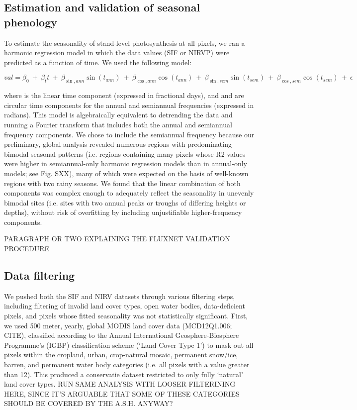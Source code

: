 \documentclass[9pt,twocolumn,twoside,lineno]{pnas-new}
\begin{document}
{\subsection*{Estimation and validation of seasonal phenology}
To estimate the seasonality of stand-level photosynthesis at all pixels,
we ran a harmonic regression model in which the data values (SIF or
NIRVP) were predicted as a function of time. We used the following model:

$$val=\beta _0\ +\ \beta _tt\ +\ \beta _{\sin ,ann}\sin (t_{ann})\ +\ \beta _{\cos ,ann}\cos (t_{ann})\ +\ \beta _{\sin ,sem}\sin (t_{sem})\ +\ \beta _{\cos ,sem}\cos (t_{sem})\ +\ \epsilon$$

where  is the linear time component (expressed in fractional days), and 
and  are circular time components for the annual and semiannual
frequencies (expressed in radians). This model is algebraically
equivalent to detrending the data and running a Fourier transform that
includes both the annual and semiannual frequency components. We chose to
include the semiannual frequency because our preliminary, global analysis
revealed numerous regions with predominating bimodal seasonal patterns
(i.e. regions containing many pixels whose R2 values were higher in
semiannual-only harmonic regression models than in annual-only models;
see Fig. SXX), many of which were expected on the basis of well-known
regions with two rainy seasons. We found that the linear combination of
both components was complex enough to adequately reflect the seasonality
in unevenly bimodal sites (i.e. sites with two annual peaks or troughs of
differing heights or depths), without risk of overfitting by including
unjustifiable higher-frequency components.

PARAGRAPH OR TWO EXPLAINING THE FLUXNET VALIDATION PROCEDURE

\subsection*{Data filtering}
We pushed both the SIF and NIRV datasets through various filtering steps,
including filtering of invalid land cover types, open water bodies,
data-deficient pixels, and pixels whose fitted seasonality was not
statistically significant. First, we used 500 meter, yearly, global MODIS
land cover data (MCD12Q1.006; CITE), classified according to the Annual
International Geosphere-Biosphere Programme’s (IGBP) classification
scheme (‘Land Cover Type 1’) to mask out all pixels within the cropland,
urban, crop-natural mosaic, permanent snow/ice, barren, and permanent
water body categories (i.e. all pixels with a value greater than 12).
This produced a conservatie dataset restricted to only fully ‘natural’
land cover types. RUN SAME ANALYSIS WITH LOOSER FILTERINING HERE, SINCE
IT’S ARGUABLE THAT SOME OF THESE CATEGORIES SHOULD BE COVERED BY THE
A.S.H. ANYWAY?

}
\end{document}
